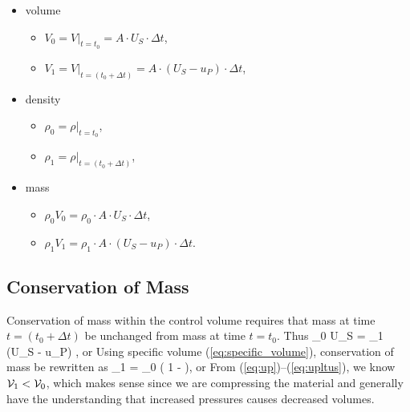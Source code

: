 \begin{itemize}
\item volume
\begin{itemize}
%
\item[] $V_0 = \left.V\right|_{t=t_0} = A \cdot U_S \cdot \Delta t$,
\item[] $V_1 = \left.V\right|_{t=(t_0 + \Delta t)} = A \cdot \left(
U_S - u_P\right) \cdot \Delta t$,
\end{itemize}
%
\item density
\begin{itemize}
\item[] $\rho_0 = \left.\rho\right|_{t=t_0}$,
\item[] $\rho_1 = \left.\rho\right|_{t=(t_0 + \Delta t)}$,
\end{itemize}
%
\item mass 
\begin{itemize}
\item[] $\rho_0 V_0 = \rho_0 \cdot A \cdot U_S \cdot \Delta t$, 
\item[] $\rho_1 V_1 = \rho_1 \cdot A \cdot \left(U_S - u_P\right) \cdot 
\Delta t$.
\end{itemize}
%
\end{itemize}

\subsection{Conservation of Mass}
Conservation of mass within the control volume requires that mass at
time $t=(t_0 + \Delta t)$ be unchanged from mass at time $t=t_0$.  
Thus
\be
 \rho_0 \cdot {} \cdot U_S \cdot {} =
 \rho_1 \cdot {} \cdot \left(U_S - u_P\right) \cdot 
 , 
\ee
or
\be
\ee
Using specific volume (\ref{eq:specific_volume}), 
conservation of mass be rewritten as
\be
\svol_1 = \svol_0 \left( 1 - \dst{} \right),
\ee
or
\be
{}
\label{eq:mass_conservation_alt}
\ee
From (\ref{eq:up})--(\ref{eq:upltus}), we know 
$\mathcal{V}_1 < \mathcal{V}_0$, which makes sense since we are compressing
the material and generally have the understanding that increased pressures
causes decreased volumes.

